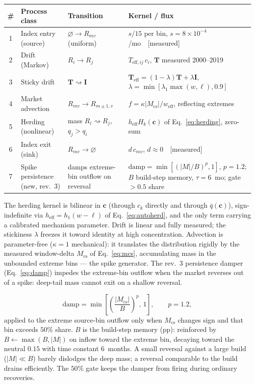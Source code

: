 \documentclass[11pt,a4paper]{article}
\begin{document}
\begin{center}
\small
\begin{tabular}{@{}clll@{}}
\toprule
\# & Process class & Transition & Kernel / flux \\
\midrule
1 & Index entry (source) & $\varnothing \to R_{mv}$ (uniform)
    & $s/15$ per bin, $s=8\times10^{-4}$/mo~~[measured] \\
2 & Drift (Markov) & $R_i \to R_j$
    & $T_{\mathrm{eff},ij}\,c_i$, $\mathbf{T}$ measured 2000--2019 \\
3 & Sticky drift & $\mathbf{T}\rightsquigarrow\mathbf{I}$
    & $\mathbf{T}_{\mathrm{eff}}=(1-\lambda)\mathbf{T}+\lambda\mathbf{I}$,
      $\lambda=\min[\lambda_1\max(w,\ell),0.9]$ \\
4 & Market advection & $R_{mv}\to R_{m\pm1,v}$
    & $f=\kappa|M_{\mathrm{cs}}|/w_{\mathrm{eff}}$, reflecting extremes \\
5 & Herding (nonlinear) & mass $R_i \rightsquigarrow R_j$, $q_j>q_i$
    & $h_{\mathrm{eff}}H_k(\mathbf{c})$ of Eq.~\eqref{eq:herding}, zero-sum \\
6 & Index exit (sink) & $R_{mv} \to \varnothing$
    & $d\,c_{mv}$, $d\approx 0$~~[measured] \\
7 & Spike persistence (new, rev.~3) & damps extreme-bin outflow on reversal
    & $\mathrm{damp}=\min[(|M|/B)^p,1]$, $p=1.2$; $B$ build-step memory,
      $\tau=6$~mo; gate $>0.5$ share \\
\bottomrule
\end{tabular}
\end{center}
The herding kernel is bilinear in $\mathbf{c}$ (through $c_k$ directly and
through $\bar q(\mathbf{c})$), sign-indefinite via
$h_{\mathrm{eff}}=h_1(w-\ell)$ of Eq.~\eqref{eq:autoherd}, and the only term
carrying a calibrated mechanism parameter.  Drift is linear and fully
measured; the stickiness $\lambda$ freezes it toward identity at high
concentration.  Advection is parameter-free ($\kappa=1$ mechanical): it
translates the distribution rigidly by the measured window-delta
$M_{\mathrm{cs}}$ of Eq.~\eqref{eq:mcs}, accumulating mass in the unbounded
extreme bins --- the spike generator.  The rev.~3 persistence damper
(Eq.~\eqref{eq:damp}) impedes the extreme-bin outflow when the market
reverses out of a spike: deep-tail mass cannot exit on a shallow reversal.

\begin{equation}
\label{eq:damp}
\mathrm{damp} = \min\!\left[\left(\frac{|M_{\mathrm{cs}}|}{B}\right)^{p},\,1\right],
\qquad p=1.2,
\end{equation}
applied to the extreme source-bin outflow only when $M_{\mathrm{cs}}$
changes sign and that bin exceeds $50\%$ share.  $B$ is the build-step
memory (pp): reinforced by $B\leftarrow\max(B,|M|)$ on inflow toward the
extreme bin, decaying toward the neutral $0.15$ with time constant
$6$~months.  A small reversal against a large build ($|M|\ll B$) barely
dislodges the deep mass; a reversal comparable to the build drains
efficiently.  The $50\%$ gate keeps the damper from firing during ordinary
recoveries.
\end{document}
